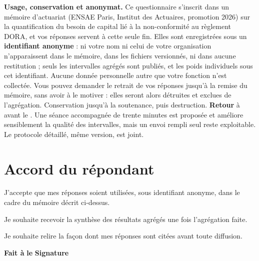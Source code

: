 \documentclass[11pt,a4paper]{article}
\begin{document}
\vspace{0.18cm}
\begin{mention}
\footnotesize
\textbf{Usage, conservation et anonymat.} Ce questionnaire s'inscrit dans un mémoire d'actuariat
(ENSAE Paris, Institut des Actuaires, promotion 2026) sur la quantification du besoin de capital
lié à la non-conformité au règlement DORA, et vos réponses servent à cette seule fin. Elles sont
enregistrées sous un \textbf{identifiant anonyme} : ni votre nom ni celui de votre organisation
n'apparaissent dans le mémoire, dans les fichiers versionnés, ni dans aucune restitution ; seuls
les intervalles agrégés sont publiés, et les poids individuels sous cet identifiant. Aucune
donnée personnelle autre que votre fonction n'est collectée. Vous pouvez demander le retrait de
vos réponses jusqu'à la remise du mémoire, sans avoir à le motiver : elles seront alors détruites
et exclues de l'agrégation. Conservation jusqu'à la soutenance, puis destruction.
\textbf{Retour} à \underline{\hspace{4.6cm}} avant le \underline{\hspace{2.4cm}}. Une séance
accompagnée de trente minutes est proposée et améliore sensiblement la qualité des intervalles,
mais un envoi rempli seul reste exploitable. Le protocole détaillé, même version, est joint.
\end{mention}

\vspace{0.45cm}
\section*{Accord du répondant}
\vspace{-0.15cm}

\noindent\framebox[0.42cm]{\rule{0pt}{0.32cm}}\; J'accepte que mes réponses soient utilisées,
sous identifiant anonyme, dans le cadre du mémoire décrit ci-dessus.

\vspace{0.18cm}
\noindent\framebox[0.42cm]{\rule{0pt}{0.32cm}}\; Je souhaite recevoir la synthèse des résultats
agrégés une fois l'agrégation faite.

\vspace{0.18cm}
\noindent\framebox[0.42cm]{\rule{0pt}{0.32cm}}\; Je souhaite relire la façon dont mes réponses
sont citées avant toute diffusion.

\vspace{0.5cm}
\noindent\textbf{Fait à} \underline{\hspace{4.4cm}} \quad
\textbf{le} \underline{\hspace{3.2cm}} \quad
\textbf{Signature} \underline{\hspace{4.4cm}}
\end{document}

